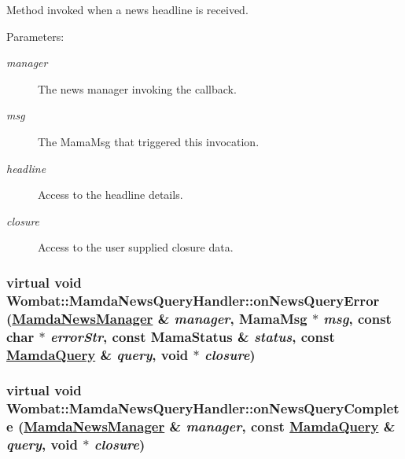 Method invoked when a news headline is received. 

\begin{Desc}
\item[Parameters:]
\begin{description}
\item[{\em manager}]The news manager invoking the callback. \item[{\em msg}]The Mama\-Msg that triggered this invocation. \item[{\em headline}]Access to the headline details. \item[{\em closure}]Access to the user supplied closure data. \end{description}
\end{Desc}
\hypertarget{classWombat_1_1MamdaNewsQueryHandler_10584e9759028e8f7896423c848cb08f}{
\subsubsection[onNewsQueryError]{\setlength{\rightskip}{0pt plus 5cm}virtual void Wombat::Mamda\-News\-Query\-Handler::on\-News\-Query\-Error (\hyperlink{classWombat_1_1MamdaNewsManager}{Mamda\-News\-Manager} \& {\em manager}, Mama\-Msg $\ast$ {\em msg}, const char $\ast$ {\em error\-Str}, const Mama\-Status \& {\em status}, const \hyperlink{classWombat_1_1MamdaQuery}{Mamda\-Query} \& {\em query}, void $\ast$ {\em closure})}}
\label{classWombat_1_1MamdaNewsQueryHandler_10584e9759028e8f7896423c848cb08f}


\hypertarget{classWombat_1_1MamdaNewsQueryHandler_5c419b05befece5ad135ab983fc8f5ac}{
\subsubsection[onNewsQueryComplete]{\setlength{\rightskip}{0pt plus 5cm}virtual void Wombat::Mamda\-News\-Query\-Handler::on\-News\-Query\-Complete (\hyperlink{classWombat_1_1MamdaNewsManager}{Mamda\-News\-Manager} \& {\em manager}, const \hyperlink{classWombat_1_1MamdaQuery}{Mamda\-Query} \& {\em query}, void $\ast$ {\em closure})}}
\label{classWombat_1_1MamdaNewsQueryHandler_5c419b05befece5ad135ab983fc8f5ac}


